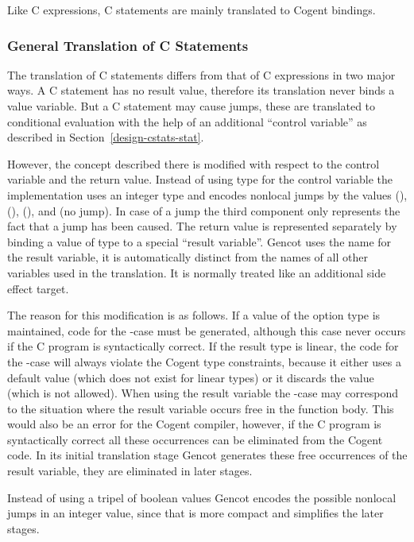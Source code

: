 Like C expressions, C statements are mainly translated to Cogent bindings.

\subsubsection{General Translation of C Statements}

The translation of C statements differs from that of C expressions in two major ways. A C statement has no result 
value, therefore its translation never binds a value variable. But a C statement may cause jumps, these are translated
to conditional evaluation with the help of an additional ``control variable''  as described in 
Section~\ref{design-cstats-stat}.

However, the concept described there is modified with respect to the control variable and the return value. Instead of using type  for the control variable the implementation uses an integer type and encodes nonlocal jumps by the 
values  (),  (),  (), and  (no jump). In case 
of a  jump the third component only represents the fact that a jump has been caused. The return value is represented 
separately by binding a value of type  to a special ``result variable''. Gencot uses the name  for the 
result variable, it is automatically distinct from the names of all other variables used in the translation. It is
normally treated like an additional side effect target.

The reason for this modification is as follows. If a value of the option type is maintained, code for the -case
must be generated, although this case never occurs if the C program is syntactically correct. If the result type  
is linear, the code for the -case will always violate the Cogent type constraints, because it either uses
a default value (which does not exist for linear types) or it discards the value (which is not allowed). When using the 
result variable the -case may correspond to the situation where the result variable occurs free in the function 
body. This would also be an error for the Cogent compiler, however, if the C program is syntactically correct all these
occurrences can be eliminated from the Cogent code. In its initial translation stage Gencot generates these free occurrences
of the result variable, they are eliminated in later stages.

Instead of using a tripel of boolean values Gencot encodes the possible nonlocal jumps in an integer value, since that is more
compact and simplifies the later stages.


